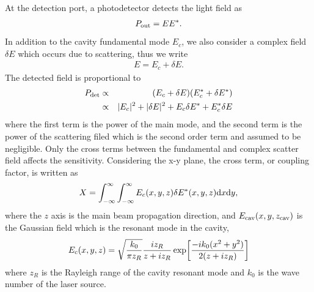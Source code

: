 At the detection port, a photodetector detects the light field as
\begin{eqnarray}
P_{\rm out}=E E^*.
\end{eqnarray}
%
In addition to the cavity fundamental mode $E_c$,
we also consider a complex field $\delta E$ which occurs due to scattering,
thus we write
\begin{eqnarray}
E=E _c + \delta E.
\end{eqnarray}
The detected field is proportional to
\begin{eqnarray}
P _{\rm det} &\propto & (E _c + \delta E) (E_c^* +\delta E ^*)\\
&\propto & |E_c| ^2 + |\delta E| ^2 + E_c \delta E ^* + E _c ^* \delta E
\end{eqnarray}
where the first term is the power of the main mode,
and the second term is the power of the scattering filed
which is the second order term and assumed to be negligible.
Only the cross terms between the fundamental and complex scatter field
affects the sensitivity.
%
Considering the x-y plane, the cross term, or coupling factor, is written as
\begin{eqnarray}
\label{eq:couple}
X=\int ^{\infty} _{-\infty} \int ^{\infty} _{-\infty} E _c (x,y,z)
\delta E ^* (x,y,z) {\rm d}x {\rm d}y,
\end{eqnarray}
where
the $z$ axis is the main beam propagation direction,
and $E _{\rm cav}(x,y,z _{\rm cav})$ is the Gaussian field which is the resonant mode in the cavity,
\begin{eqnarray}
E _{\rm c}(x,y,z)=\sqrt{\frac{k_0}{\pi z_R}} \frac{i z_R}{z+i z_R}
\exp \biggl[ \frac{-i k_0 (x^2 +y^2)}{2(z+i z_R)} \biggr]
\end{eqnarray}
where $z_R$ is the Rayleigh range of the cavity resonant mode and $k_0$
is the wave number of the laser source.


